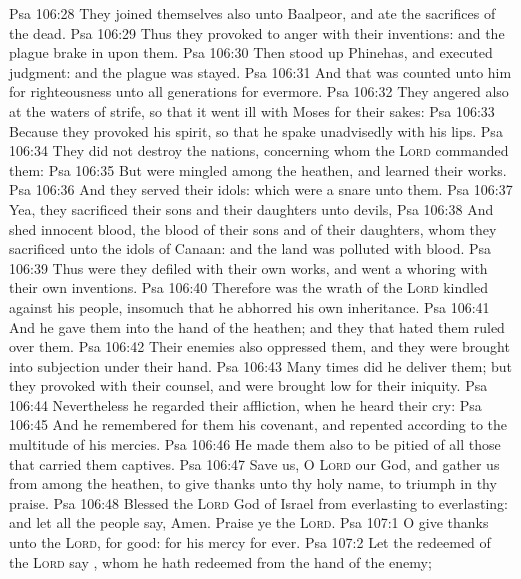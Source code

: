 \vs Psa 106:28 They joined themselves also unto Baalpeor, and ate the sacrifices of the dead.
\vs Psa 106:29 Thus they provoked  to anger with their inventions: and the plague brake in upon them.
\vs Psa 106:30 Then stood up Phinehas, and executed judgment: and  the plague was stayed.
\vs Psa 106:31 And that was counted unto him for righteousness unto all generations for evermore.
\vs Psa 106:32 They angered  also at the waters of strife, so that it went ill with Moses for their sakes:
\vs Psa 106:33 Because they provoked his spirit, so that he spake unadvisedly with his lips.
\vs Psa 106:34 They did not destroy the nations, concerning whom the \textsc{Lord} commanded them:
\vs Psa 106:35 But were mingled among the heathen, and learned their works.
\vs Psa 106:36 And they served their idols: which were a snare unto them.
\vs Psa 106:37 Yea, they sacrificed their sons and their daughters unto devils,
\vs Psa 106:38 And shed innocent blood,  the blood of their sons and of their daughters, whom they sacrificed unto the idols of Canaan: and the land was polluted with blood.
\vs Psa 106:39 Thus were they defiled with their own works, and went a whoring with their own inventions.
\vs Psa 106:40 Therefore was the wrath of the \textsc{Lord} kindled against his people, insomuch that he abhorred his own inheritance.
\vs Psa 106:41 And he gave them into the hand of the heathen; and they that hated them ruled over them.
\vs Psa 106:42 Their enemies also oppressed them, and they were brought into subjection under their hand.
\vs Psa 106:43 Many times did he deliver them; but they provoked  with their counsel, and were brought low for their iniquity.
\vs Psa 106:44 Nevertheless he regarded their affliction, when he heard their cry:
\vs Psa 106:45 And he remembered for them his covenant, and repented according to the multitude of his mercies.
\vs Psa 106:46 He made them also to be pitied of all those that carried them captives.
\vs Psa 106:47 Save us, O \textsc{Lord} our God, and gather us from among the heathen, to give thanks unto thy holy name,  to triumph in thy praise.
\vs Psa 106:48 Blessed  the \textsc{Lord} God of Israel from everlasting to everlasting: and let all the people say, Amen. Praise ye the \textsc{Lord}.
\vs Psa 107:1 O give thanks unto the \textsc{Lord}, for  good: for his mercy  for ever.
\vs Psa 107:2 Let the redeemed of the \textsc{Lord} say , whom he hath redeemed from the hand of the enemy;
